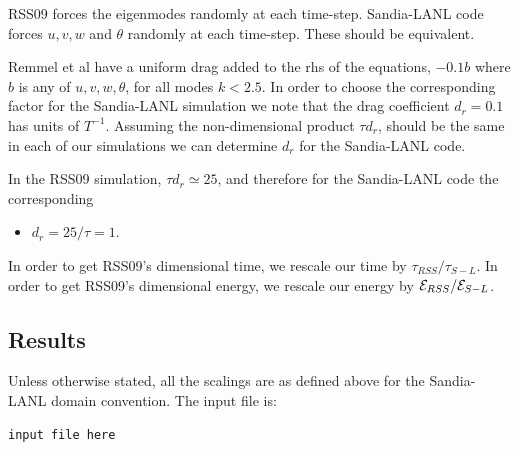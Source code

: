 \documentclass[12pt]{article}
\begin{document}
RSS09 forces the eigenmodes randomly at each time-step. Sandia-LANL
code forces $u,v,w$ and $\theta$ randomly at each time-step. These
should be equivalent.

Remmel et al have a uniform drag added to the rhs of the equations, 
$-0.1 b$ where $b$ is any
of $u,v,w,\theta$, for all modes $k < 2.5$. In order to choose the
corresponding factor for the Sandia-LANL simulation we note that the
drag coefficient $d_r = 0.1$ has units of $T^{-1}$. Assuming the
non-dimensional product $\tau d_r$, should be the same in each of our
simulations we can determine $d_r$ for the Sandia-LANL code. 

In the RSS09 simulation, $\tau d_r \simeq 25$, and
therefore for the Sandia-LANL code the corresponding 
\begin{itemize}
\item $d_r = 25/\tau = 1$.
\end{itemize}
In order to get RSS09's dimensional time, we rescale our time by
$\tau_{RSS}/\tau_{S-L}$. In order to get RSS09's dimensional energy,
we rescale our energy by ${\cal E}_{RSS}/{\cal E}_{S-L}$.

\subsection{Results}
Unless otherwise stated, all the scalings are as defined above for the
Sandia-LANL domain convention. The input file is:

\begin{verbatim}
input file here

\end{verbatim}
\end{document}
